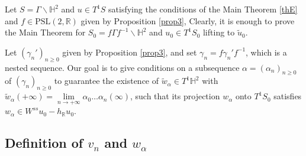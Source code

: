 \documentclass[a4paper,english,reqno]{amsart}
\newcommand{\R}{\mathbb{R}}
\renewcommand{\H}{\mathbb{H}}
\newcommand{\N}{\mathbb{N}} %
\theoremstyle{definition}
\newtheorem{remark}{Remark}
\numberwithin{equation}{section}
\begin{document}

Let $S=\Gamma\backslash \H^2$ and $u\in T^1 S$ satisfying the conditions of the Main Theorem \ref{thE} and $f\in\operatorname{PSL(2,\R)}$ given by Proposition \ref{prop3}, Clearly, it is enough to prove the Main Theorem for $S_0=f\Gamma f^{-1}\backslash \H^2$ and $u_0\in T^1S_0$ lifting to $\tilde u_0$.

Let $(\gamma_n')_{n\geq 0}$ given by Proposition \ref{prop3}, and set $\gamma_n=f\gamma_n'f^{-1}$, which is a nested sequence. %
 Our goal is to give conditions on a subsequence $\alpha=(\alpha_n)_{n\geq0}$ of $(\gamma_n)_{n\geq 0}$ to guarantee the existence of $\tilde w_\alpha \in T^1\H^2$ with $\tilde w_\alpha(+\infty)=\lim\limits_{n\to +\infty}\alpha_0\ldots\alpha_n(\infty)$, such that its projection $w_\alpha$ onto $T^1S_0$ satisfies $ w_\alpha\in W^{ss}u_0-h_\R u_0$.


 






\subsection{Definition of $v_n$ and $w_\alpha$}

\par\,
\end{document}
